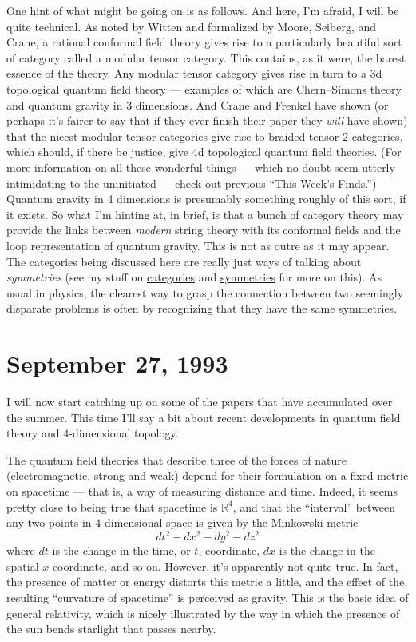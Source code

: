 \documentclass{article}
\begin{document}
One hint of what might be going on is as follows. And here, I'm afraid,
I will be quite technical. As noted by Witten and formalized by Moore,
Seiberg, and Crane, a rational conformal field theory gives rise to a
particularly beautiful sort of category called a modular tensor
category. This contains, as it were, the barest essence of the theory.
Any modular tensor category gives rise in turn to a 3d topological
quantum field theory --- examples of which are Chern--Simons theory and
quantum gravity in 3 dimensions. And Crane and Frenkel have shown (or
perhaps it's fairer to say that if they ever finish their paper they
\emph{will} have shown) that the nicest modular tensor categories give
rise to braided tensor \(2\)-categories, which should, if there be
justice, give 4d topological quantum field theories. (For more
information on all these wonderful things --- which no doubt seem
utterly intimidating to the uninitiated --- check out previous ``This
Week's Finds.'') Quantum gravity in 4 dimensions is presumably something
roughly of this sort, if it exists. So what I'm hinting at, in brief, is
that a bunch of category theory may provide the links between
\emph{modern} string theory with its conformal fields and the loop
representation of quantum gravity. This is not as outre as it may
appear. The categories being discussed here are really just ways of
talking about \emph{symmetries} (see my stuff on
\href{http://math.ucr.edu/home/baez/categories.html}{categories} and
\href{http://math.ucr.edu/home/baez/symmetries.html}{symmetries} for
more on this). As usual in physics, the clearest way to grasp the
connection between two seemingly disparate problems is often by
recognizing that they have the same symmetries.



\hypertarget{week19}{%
\section{September 27, 1993}\label{week19}}

I will now start catching up on some of the papers that have accumulated
over the summer. This time I'll say a bit about recent developments in
quantum field theory and \(4\)-dimensional topology.

The quantum field theories that describe three of the forces of nature
(electromagnetic, strong and weak) depend for their formulation on a
fixed metric on spacetime --- that is, a way of measuring distance and
time. Indeed, it seems pretty close to being true that spacetime is
\(\mathbb{R}^4\), and that the ``interval'' between any two points in
\(4\)-dimensional space is given by the Minkowski metric
\[dt^2 -dx^2 -dy^2 -dz^2\] where \(dt\) is the change in the time, or
\(t\), coordinate, \(dx\) is the change in the spatial \(x\) coordinate,
and so on. However, it's apparently not quite true. In fact, the
presence of matter or energy distorts this metric a little, and the
effect of the resulting ``curvature of spacetime'' is perceived as
gravity. This is the basic idea of general relativity, which is nicely
illustrated by the way in which the presence of the sun bends starlight
that passes nearby.
\end{document}
